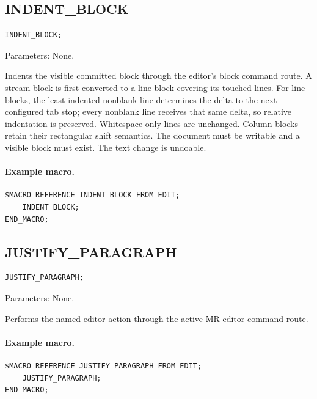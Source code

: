 \documentclass[a4paper,10pt,twoside,openany]{book}
\newenvironment{mrmacextension}{\begin{changebar}}{\end{changebar}}
\begin{document}
\begin{mrmacextension}
\label{prim:procedure-indent-block}
\subsection*{INDENT\_BLOCK}
\begin{verbatim}
INDENT_BLOCK;
\end{verbatim}
Parameters: None.

Indents the visible committed block through the editor's block command route.
A stream block is first converted to a line block covering its touched lines.
For line blocks, the least-indented nonblank line determines the delta to the
next configured tab stop; every nonblank line receives that same delta, so
relative indentation is preserved. Whitespace-only lines are unchanged.
Column blocks retain their rectangular shift semantics. The document must be
writable and a visible block must exist. The text change is undoable.

\paragraph{Example macro.}
\begin{verbatim}
$MACRO REFERENCE_INDENT_BLOCK FROM EDIT;
    INDENT_BLOCK;
END_MACRO;
\end{verbatim}
\end{mrmacextension}

\begin{mrmacextension}
\label{prim:procedure-justify-paragraph}
\subsection*{JUSTIFY\_PARAGRAPH}
\begin{verbatim}
JUSTIFY_PARAGRAPH;
\end{verbatim}
Parameters: None.

Performs the named editor action through the active MR editor command route.

\paragraph{Example macro.}
\begin{verbatim}
$MACRO REFERENCE_JUSTIFY_PARAGRAPH FROM EDIT;
    JUSTIFY_PARAGRAPH;
END_MACRO;
\end{verbatim}
\end{mrmacextension}
\end{document}
